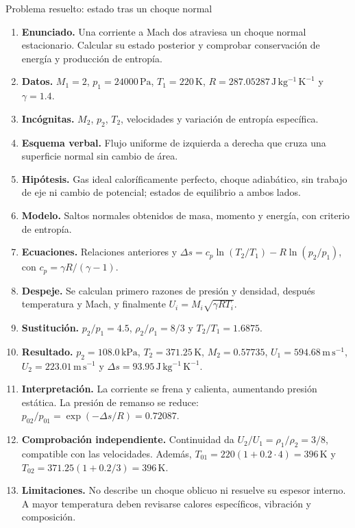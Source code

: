 \begin{studiumworked}{Problema resuelto: estado tras un choque normal}

\begin{enumerate}
\item \textbf{Enunciado.} Una corriente a Mach dos atraviesa un choque normal estacionario. Calcular su estado posterior y comprobar conservación de energía y producción de entropía.
\item \textbf{Datos.} $M_1=2$, $p_1=24000\,\mathrm{Pa}$, $T_1=220\,\mathrm{K}$, $R=287.05287\,\mathrm{J\,kg^{-1}\,K^{-1}}$ y $\gamma=1.4$.
\item \textbf{Incógnitas.} $M_2$, $p_2$, $T_2$, velocidades y variación de entropía específica.
\item \textbf{Esquema verbal.} Flujo uniforme de izquierda a derecha que cruza una superficie normal sin cambio de área.
\item \textbf{Hipótesis.} Gas ideal caloríficamente perfecto, choque adiabático, sin trabajo de eje ni cambio de potencial; estados de equilibrio a ambos lados.
\item \textbf{Modelo.} Saltos normales obtenidos de masa, momento y energía, con criterio de entropía.
\item \textbf{Ecuaciones.} Relaciones anteriores y $\Delta s=c_p\ln(T_2/T_1)-R\ln(p_2/p_1)$, con $c_p=\gamma R/(\gamma-1)$.
\item \textbf{Despeje.} Se calculan primero razones de presión y densidad, después temperatura y Mach, y finalmente $U_i=M_i\sqrt{\gamma RT_i}$.
\item \textbf{Sustitución.} $p_2/p_1=4.5$, $\rho_2/\rho_1=8/3$ y $T_2/T_1=1.6875$.
\item \textbf{Resultado.} $p_2=108.0\,\mathrm{kPa}$, $T_2=371.25\,\mathrm{K}$, $M_2=0.57735$, $U_1=594.68\,\mathrm{m\,s^{-1}}$, $U_2=223.01\,\mathrm{m\,s^{-1}}$ y $\Delta s=93.95\,\mathrm{J\,kg^{-1}\,K^{-1}}$.
\item \textbf{Interpretación.} La corriente se frena y calienta, aumentando presión estática. La presión de remanso se reduce: $p_{02}/p_{01}=\exp(-\Delta s/R)=0.72087$.
\item \textbf{Comprobación independiente.} Continuidad da $U_2/U_1=\rho_1/\rho_2=3/8$, compatible con las velocidades. Además, $T_{01}=220(1+0.2\cdot4)=396\,\mathrm{K}$ y $T_{02}=371.25(1+0.2/3)=396\,\mathrm{K}$.
\item \textbf{Limitaciones.} No describe un choque oblicuo ni resuelve su espesor interno. A mayor temperatura deben revisarse calores específicos, vibración y composición.
\end{enumerate}


\end{studiumworked}

